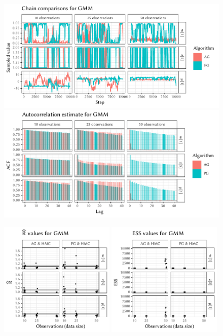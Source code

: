 \begin{figure}[p]
  \centering
  \includegraphics[width=\textwidth]{figures/GMM-chains}
  \par
  \includegraphics[width=\textwidth]{figures/GMM-acfs}
  \par
  \includegraphics[width=0.49\textwidth]{figures/GMM-rhat}
  \includegraphics[width=0.49\textwidth]{figures/GMM-ess}
  \caption{}
  \label{fig:plots-gmm-right}
\end{figure}

